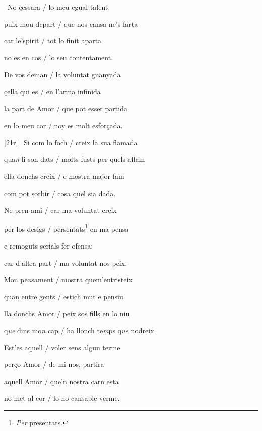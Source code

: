 \documentclass[12pt]{article}
\begin{document}
\begin{estrofa}

 \textparagraph\  No \c{c}essara / lo meu egual talent

 puix mou depart / que nos cansa ne's farta

 car le'spirit / tot lo finit aparta

 no es en cos / lo seu contentament.

 De vos deman / la voluntat guanyada

 \c{c}ella qui es / en l'arma infinida

 la part de Amor / que pot esser partida

 en lo meu cor / noy es molt esfor\c{c}ada.

\end{estrofa}



\begin{estrofa}

 [21r] \textparagraph\  Si com lo foch / creix la sua flamada

 qua\textit{n} li son dats / molts fusts per quels aflam

 ella donchs creix / e mostra major fam

 com pot sorbir / cosa quel sia dada.

 Ne pren ami / car ma voluntat creix

 per los desigs / persentats\footnote{\textit{Per} presentats.} en ma pensa

 e remoguts serials fer ofensa:

 car d'altra part / ma voluntat nos peix.

\end{estrofa}



\begin{estrofa}

 Mon pe\textit{n}sament / mostra quem'entristeix

 quan entre gents / estich mut e pensiu

 lla donchs Amor / peix sos fills en lo niu

 q\textit{ue} dins mo\textit{n} cap / ha llonch te\textit{m}ps q\textit{ue}
nodreix.

 Est'es aquell / voler sens algun terme

 per\c{c}o Amor / de mi nos, partira

 aquell Amor / que'n nostra carn esta

 no met al cor / lo no cansable verme.

\end{estrofa}
\end{document}
